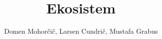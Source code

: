 \documentclass[a4paper, 12pt]{article}
\begin{document}
\title{Ekosistem}
\author{Domen Mohorčič, Larsen Cundrič, Mustafa Grabus}
\maketitle
\end{document}
